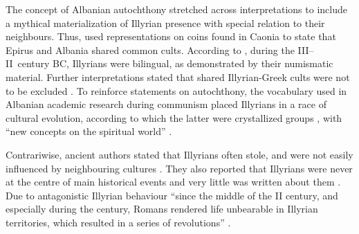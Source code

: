	
	The concept of Albanian autochthony stretched across interpretations to include a mythical materialization of Illyrian presence with special relation to their neighbours. Thus, \textcite{Tzouvara-Souli1993} used representations on coins found in Caonia to state that Epirus and Albania shared common cults. According to \textcite[342]{Waibank1974}, during the III--II\ century BC, Illyrians were bilingual, as demonstrated by their numismatic material. Further interpretations stated that shared Illyrian-Greek cults were not to be excluded \parencite[147]{Meta2006}. To reinforce statements on autochthony, the vocabulary used in Albanian academic research during communism placed Illyrians in a race of cultural evolution, according to which the latter were crystallized groups \parencite[95]{Prendi1985}, with “new concepts on the spiritual world” \parencite[trans.][271]{Aliu1985}.
	
	Contrariwise, ancient authors stated that Illyrians often stole, and were not easily influenced by neighbouring cultures \parencites{Islami2002}{Ceka1974}{Anamali1987}. They also reported that Illyrians were never at the centre of main historical events and very little was written about them \parencite[371]{Franke1974}. Due to antagonistic Illyrian behaviour ``since the middle of the II century\BC, and especially during the  century\BC, Romans rendered life unbearable in Illyrian territories, which resulted in a series of revolutions'' \parencite[trans.][6]{Anamali1987}. 
		
	
